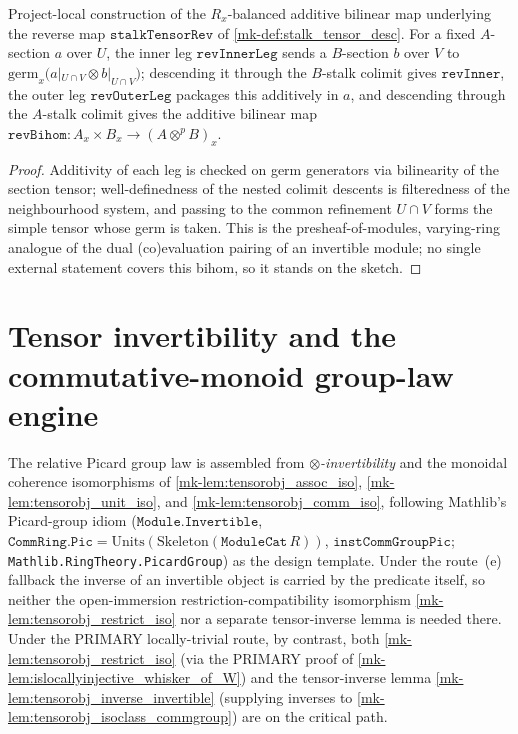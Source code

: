 \begin{definition}
  \label{mk-def:rev_bihom}

  Project-local construction of the \(R_x\)-balanced additive bilinear map underlying the
  reverse map \(\mathtt{stalkTensorRev}\) of \ref{mk-def:stalk_tensor_desc}. For a fixed
  \(A\)-section \(a\) over \(U\), the inner leg \(\mathtt{revInnerLeg}\) sends a
  \(B\)-section \(b\) over \(V\) to \(\mathrm{germ}_x\bigl(a|_{U\cap V} \otimes
  b|_{U\cap V}\bigr)\); descending it through the \(B\)-stalk colimit gives
  \(\mathtt{revInner}\), the outer leg \(\mathtt{revOuterLeg}\) packages this additively in
  \(a\), and descending through the \(A\)-stalk colimit gives the additive bilinear map
  \(\mathtt{revBihom}\colon A_x \times B_x \to (A \otimes^{p} B)_x\).
\end{definition}
\begin{proof}
 Additivity of each leg is checked on germ generators via
  bilinearity of the section tensor; well-definedness of the nested colimit descents is
  filteredness of the neighbourhood system, and passing to the common refinement
  \(U\cap V\) forms the simple tensor whose germ is taken. This is the
  presheaf-of-modules, varying-ring analogue of the dual (co)evaluation pairing of an
  invertible module; no single external statement covers this bihom, so it stands on the
  sketch.
\end{proof}

\section{Tensor invertibility and the commutative-monoid group-law engine}
\label{mk-sec:tensorobj_invertibility}

The relative Picard group law is assembled from \emph{\(\otimes\)-invertibility}
and the monoidal coherence isomorphisms of
\ref{mk-lem:tensorobj_assoc_iso}, \ref{mk-lem:tensorobj_unit_iso}, and
\ref{mk-lem:tensorobj_comm_iso},
following Mathlib's Picard-group idiom (\(\mathtt{Module.Invertible}\),
\(\mathtt{CommRing.Pic} = \mathrm{Units}(\mathrm{Skeleton}(\mathtt{ModuleCat}\,R))\),
\(\mathtt{instCommGroupPic}\); \texttt{Mathlib.RingTheory.PicardGroup}) as the
design template. Under the route~(e) fallback the inverse of an invertible object
is carried by the predicate itself, so neither the open-immersion
restriction-compatibility isomorphism \ref{mk-lem:tensorobj_restrict_iso} nor a
separate tensor-inverse lemma is needed there. Under the PRIMARY locally-trivial
route, by contrast, both \ref{mk-lem:tensorobj_restrict_iso} (via the PRIMARY proof
of \ref{mk-lem:islocallyinjective_whisker_of_W}) and the tensor-inverse lemma
\ref{mk-lem:tensorobj_inverse_invertible} (supplying inverses to
\ref{mk-lem:tensorobj_isoclass_commgroup}) are on the critical path.

